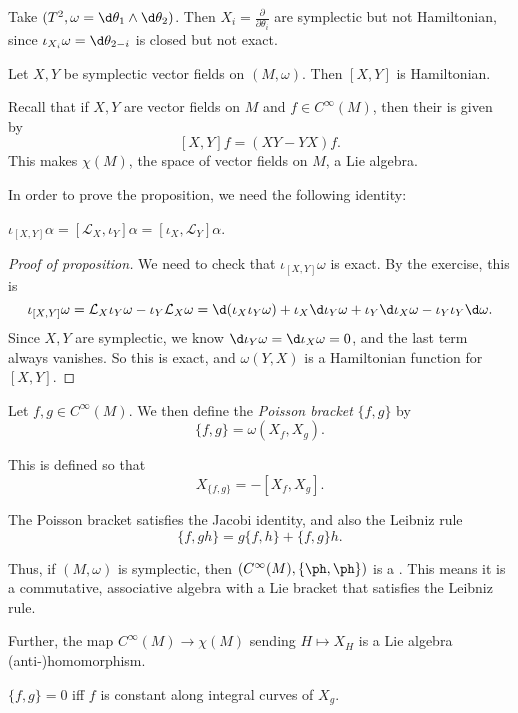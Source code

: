 \documentclass[a4paper]{article}
\begin{document}
\begin{eg}
  Take $(T^2, \omega = \d \theta_1 \wedge \d \theta_2)$. Then $X_i = \frac{\partial}{\partial \theta_i}$ are symplectic but not Hamiltonian, since $\iota_{X_i} \omega = \d \theta_{2 - i}$ is closed but not exact.
\end{eg}

\begin{prop}
  Let $X, Y$ be symplectic vector fields on $(M, \omega)$. Then $[X, Y]$ is Hamiltonian.
\end{prop}
Recall that if $X, Y$ are vector fields on $M$ and $f \in C^\infty(M)$, then their  is given by
\[
  [X, Y]f = (XY - YX)f.
\]
This makes $\chi(M)$, the space of vector fields on $M$, a Lie algebra.

In order to prove the proposition, we need the following identity:
\begin{ex}
  $\iota_{[X, Y]}\alpha = [\mathcal{L}_X, \iota_Y] \alpha = [\iota_X, \mathcal{L}_Y] \alpha$.
\end{ex}

\begin{proof}[Proof of proposition]
  We need to check that $\iota_{[X, Y]} \omega$ is exact. By the exercise, this is
  \[
    \iota_{[X, Y]}\omega = \mathcal{L}_X \iota_Y \omega - \iota_Y \mathcal{L}_X \omega = \d (\iota_X \iota_Y \omega) + \iota_X \d \iota_Y \omega + \iota_Y \d \iota_X \omega - \iota_Y \iota_Y \d \omega.
  \]
  Since $X, Y$ are symplectic, we know $\d \iota_Y \omega = \d \iota_X \omega = 0$, and the last term always vanishes. So this is exact, and $\omega(Y, X)$ is a Hamiltonian function for $[X, Y]$.
\end{proof}

\begin{defi}
  Let $f, g \in C^\infty(M)$. We then define the \emph{Poisson bracket} $\{f, g\}$ by
  \[
    \{f, g\} = \omega(X_f, X_g).
  \]
\end{defi}
This is defined so that
\[
  X_{\{f, g\}} = -[X_f, X_g].
\]
\begin{ex}
  The Poisson bracket satisfies the Jacobi identity, and also the Leibniz rule
  \[
    \{f, gh\} = g\{f, h\} + \{f, g\}h.
  \]
\end{ex}
Thus, if $(M, \omega)$ is symplectic, then $(C^\infty(M), \{\ph, \ph\})$ is a . This means it is a commutative, associative algebra with a Lie bracket that satisfies the Leibniz rule.

Further, the map $C^\infty(M) \to \chi(M)$ sending $H \mapsto X_H$ is a Lie algebra (anti-)homomorphism.

\begin{prop}
  $\{f, g\} = 0$ iff $f$ is constant along integral curves of $X_g$.
\end{prop}
\end{document}
